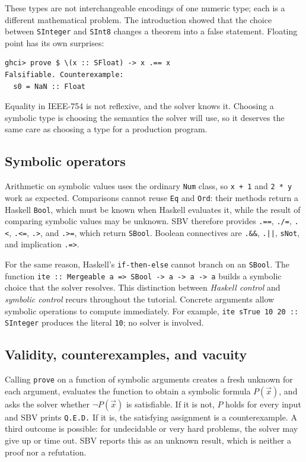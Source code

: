 \documentclass[review]{jfp-epi}
\newcommand{\code}[1]{\texttt{#1}}
\begin{document}
These types are not interchangeable encodings of one numeric type; each is a
different mathematical problem. The introduction showed that the choice between
\code{SInteger} and \code{SInt8} changes a theorem into a false statement.
Floating point has its own surprises:
\begin{lstlisting}
ghci> prove $ \(x :: SFloat) -> x .== x
Falsifiable. Counterexample:
  s0 = NaN :: Float
\end{lstlisting}
Equality in IEEE-754 is not reflexive, and the solver knows it. Choosing a
symbolic type is choosing the semantics the solver will use, so it deserves the
same care as choosing a type for a production program.

\subsection{Symbolic operators}

Arithmetic on symbolic values uses the ordinary \code{Num} class, so \code{x + 1}
and \code{2 * y} work as expected. Comparisons cannot reuse \code{Eq} and
\code{Ord}: their methods return a Haskell \code{Bool}, which must be known when
Haskell evaluates it, while the result of comparing symbolic values may be
unknown. SBV therefore provides \code{.==}, \code{./=}, \code{.<}, \code{.<=},
\code{.>}, and \code{.>=}, which return \code{SBool}. Boolean connectives are
\code{.\&\&}, \code{.||}, \code{sNot}, and implication \code{.=>}.

For the same reason, Haskell's \code{if-then-else} cannot branch on an
\code{SBool}. The function \code{ite :: Mergeable a => SBool -> a -> a -> a}
builds a symbolic choice that the solver resolves. This distinction between
\emph{Haskell control} and \emph{symbolic control} recurs throughout the
tutorial. Concrete arguments allow symbolic operations to compute immediately.
For example, \code{ite sTrue 10 20 :: SInteger} produces the literal \code{10};
no solver is involved.

\subsection{Validity, counterexamples, and vacuity}

Calling \code{prove} on a function of symbolic arguments creates a fresh
unknown for each argument, evaluates the function to obtain a symbolic formula
$P(\vec{x})$, and asks the solver whether $\neg P(\vec{x})$ is satisfiable. If it
is not, $P$ holds for every input and SBV prints \code{Q.E.D.} If it is, the
satisfying assignment is a counterexample. A third outcome is possible: for
undecidable or very hard problems, the solver may give up or time out. SBV reports
this as an unknown result, which is neither a proof nor a refutation.
\end{document}
